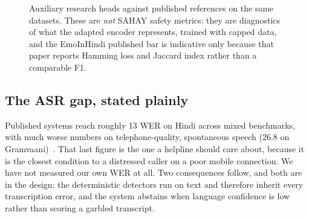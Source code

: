 \documentclass[11pt,a4paper]{article}
\begin{document}
\begin{figure}[!htbp]
\centering
{}
\caption{Auxiliary research heads against published references on the same datasets. These are
\emph{not} SAHAY safety metrics: they are diagnostics of what the adapted encoder represents, trained
with capped data, and the EmoInHindi published bar is indicative only because that paper reports
Hamming loss and Jaccard index rather than a comparable F1.}
\label{fig:benchbars}
\end{figure}

\subsection{The ASR gap, stated plainly}
Published systems reach roughly 13 WER on Hindi across mixed benchmarks, with much worse numbers on
telephone-quality, spontaneous speech (26.8 on Gramvaani)~\cite{vistaar}. That last figure is the one
a helpline should care about, because it is the closest condition to a distressed caller on a poor
mobile connection. We have not measured our own WER at all. Two consequences follow, and both are in
the design: the deterministic detectors run on text and therefore inherit every transcription error,
and the system abstains when language confidence is low rather than scoring a garbled transcript.
\end{document}
